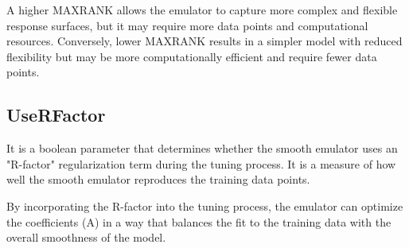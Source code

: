 \documentclass[12pt]{article}
\numberwithin{equation}{section}
\numberwithin{figure}{section}
\begin{document}
A higher MAXRANK allows the emulator to capture more complex and flexible response surfaces, but it may require more data points and computational resources. Conversely, lower MAXRANK results in a simpler model with reduced flexibility but may be more computationally efficient and require fewer data points.


\subsection{UseRFactor}
It is a boolean parameter that determines whether the smooth emulator uses an "R-factor" regularization term during the tuning process. It is a measure of how well the smooth emulator reproduces the training data points.

By incorporating the R-factor into the tuning process, the emulator can optimize the coefficients (A) in a way that balances the fit to the training data with the overall smoothness of the model.
\end{document}
